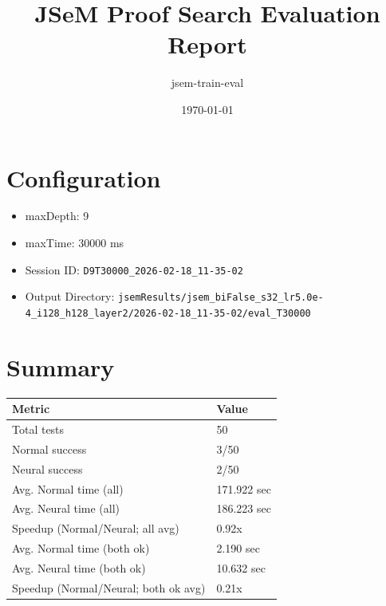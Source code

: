 \documentclass[a4paper,10pt]{article}
\title{JSeM Proof Search Evaluation Report}
\author{jsem-train-eval}
\date{\today}
\begin{document}
\maketitle

\section{Configuration}
\begin{itemize}
\item maxDepth: 9
\item maxTime: 30000 ms
\item Session ID: \texttt{D9T30000\_2026-02-18\_11-35-02}
\item Output Directory: \texttt{jsemResults/jsem\_biFalse\_s32\_lr5.0e-4\_i128\_h128\_layer2/2026-02-18\_11-35-02/eval\_T30000}
\end{itemize}

\section{Summary}
\begin{tabular}{ll}
\toprule
\textbf{Metric} & \textbf{Value} \\
\midrule
Total tests & 50 \\
Normal success & 3/50 \\
Neural success & 2/50 \\
\midrule
Avg. Normal time (all) & 171.922 sec \\
Avg. Neural time (all) & 186.223 sec \\
Speedup (Normal/Neural; all avg) & 0.92x \\
Avg. Normal time (both ok) & 2.190 sec \\
Avg. Neural time (both ok) & 10.632 sec \\
Speedup (Normal/Neural; both ok avg) & 0.21x \\
\bottomrule
\end{tabular}
\end{document}

